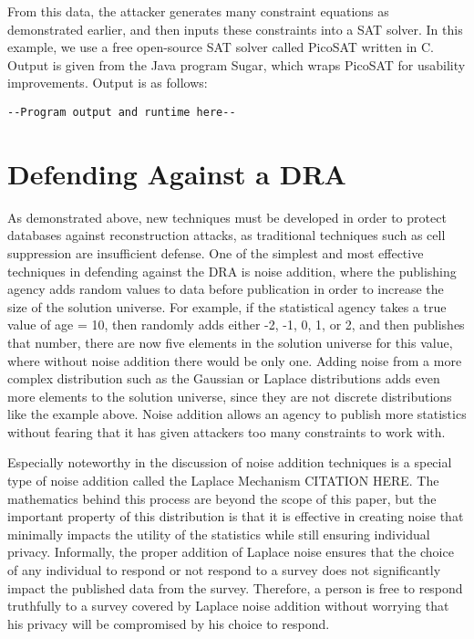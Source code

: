 \documentclass[jou,apacite]{apa6}
\begin{document}
From this data, the attacker generates many constraint equations as demonstrated earlier,
and then inputs these constraints into a SAT solver. In this example, we use a free open-source SAT solver
called PicoSAT written in C. Output is given from the Java program Sugar, which wraps PicoSAT for usability improvements.
\newline Output is as follows:
\begin{verbatim}
--Program output and runtime here--
\end{verbatim}

\section{Defending Against a DRA}
As demonstrated above, new techniques must be developed in
order to protect databases against reconstruction attacks, as traditional techniques such as cell suppression are insufficient defense. One of the simplest and most effective techniques in defending against the DRA is noise addition, where the publishing agency adds random values to data before publication in order to increase the size of the solution universe. For example, if the statistical agency takes a true value of age = 10, then randomly adds either -2, -1, 0, 1, or 2, and then publishes that number, there are now five elements in the solution universe for this value, where without noise addition there would be only one. Adding noise from a more complex distribution such as the Gaussian or Laplace distributions adds even more elements to the solution universe, since they are not discrete distributions like the example above. Noise addition allows an agency to publish more statistics without fearing that it has given attackers too many constraints to work with.

Especially noteworthy in the discussion of noise addition techniques is a special type of noise addition called the Laplace Mechanism CITATION HERE.
The mathematics behind this process are beyond the scope of this paper, but the important property of this distribution is that it is effective in creating noise that minimally impacts the utility of the statistics while still ensuring individual privacy. Informally, the proper addition of Laplace noise ensures that the choice of any individual to respond or not respond to a survey does not significantly impact the published data from the survey. Therefore, a person is free to respond truthfully to a survey covered by Laplace noise addition without worrying that his privacy will be compromised by his choice to respond.
\end{document}
